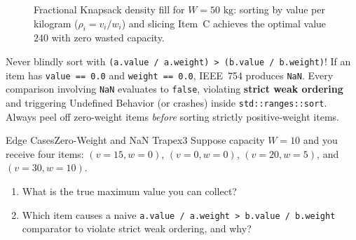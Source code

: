 \documentclass[11pt,a4paper]{article}
\theoremstyle{definition}
\begin{document}
\begin{figure}[htbp]
\caption{Fractional Knapsack density fill for $W = 50\text{ kg}$: sorting by value per kilogram ($\rho_i = v_i / w_i$) and slicing Item~C achieves the optimal value $240$ with zero wasted capacity.}
\label{fig:fractional_knapsack}
\end{figure}

\begin{watchoutbox}
Never blindly sort with \texttt{(a.value / a.weight) > (b.value / b.weight)}! If an item has \texttt{value == 0.0} and \texttt{weight == 0.0}, IEEE~754 produces \texttt{NaN}. Every comparison involving \texttt{NaN} evaluates to \texttt{false}, violating \textbf{strict weak ordering} and triggering Undefined Behavior (or crashes) inside \texttt{std::ranges::sort}. Always peel off zero-weight items \emph{before} sorting strictly positive-weight items.
\end{watchoutbox}

\begin{tryitbox}{Edge Cases}{Zero-Weight and NaN Trap}{ex3}
Suppose capacity $W = 10$ and you receive four items: $(v{=}15, w{=}0)$, $(v{=}0, w{=}0)$, $(v{=}20, w{=}5)$, and $(v{=}30, w{=}10)$.
\begin{enumerate}[itemsep=1pt, topsep=2pt]
    \item What is the true maximum value you can collect?
    \item Which item causes a naive \texttt{a.value / a.weight > b.value / b.weight} comparator to violate strict weak ordering, and why?
\end{enumerate}
\end{tryitbox}
\end{document}
